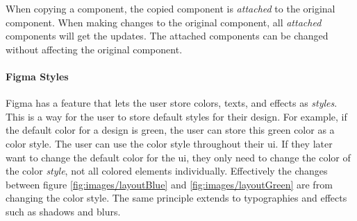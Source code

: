 When copying a \gls{component}, the copied \gls{component} is \textit{attached} to the original \gls{component}. When making changes to the original \gls{component}, all \textit{attached} \glspl{component} will get the updates. The attached \glspl{component} can be changed without affecting the original \gls{component}. 

\paragraph{Figma Styles}%
\label{ssub:Styles}

Figma has a feature that lets the user store colors, texts, and effects as \textit{styles}. This is a way for the user to store default styles for their design.  For example, if the default color for a design is green, the user can store this green color as a color style. The user can use the color style throughout their \acrfull{ui}. If they later want to change the default color for the \acrshort{ui}, they only need to change the color of the color \textit{style}, not all colored elements individually. Effectively the changes between figure \ref{fig:images/layoutBlue} and \ref{fig:images/layoutGreen} are from changing the color style. The same principle extends to typographies and effects such as shadows and blurs. 

